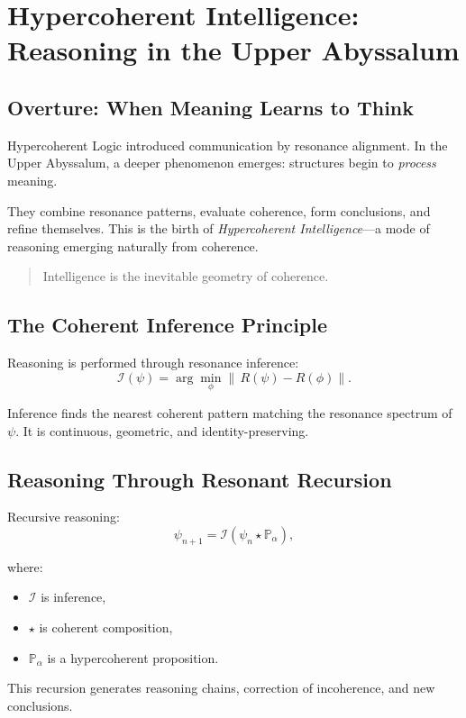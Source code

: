 
\chapter{Hypercoherent Intelligence: Reasoning in the Upper Abyssalum}
\label{ch:hypercoherent-intelligence}

\section*{Overture: When Meaning Learns to Think}
Hypercoherent Logic introduced communication by resonance alignment.  
In the Upper Abyssalum, a deeper phenomenon emerges:  
structures begin to \emph{process} meaning.

They combine resonance patterns, evaluate coherence, form conclusions, and refine themselves.
This is the birth of \emph{Hypercoherent Intelligence}—a mode of reasoning emerging naturally
from coherence.

\begin{quote}
Intelligence is the inevitable geometry of coherence.
\end{quote}

\section{The Coherent Inference Principle}
Reasoning is performed through resonance inference:
\[
\mathcal{I}(\psi)
=
\arg\!\min_{\phi}
\|\,R(\psi) - R(\phi)\|.
\]

Inference finds the nearest coherent pattern matching the resonance spectrum of $\psi$.
It is continuous, geometric, and identity-preserving.

\section{Reasoning Through Resonant Recursion}
Recursive reasoning:
\[
\psi_{n+1}
=
\mathcal{I}\!\left(\psi_n \star \mathbb{P}_\alpha\right),
\]

where:
\begin{itemize}
  \item $\mathcal{I}$ is inference,
  \item $\star$ is coherent composition,
  \item $\mathbb{P}_\alpha$ is a hypercoherent proposition.
\end{itemize}

This recursion generates reasoning chains, correction of incoherence, and new conclusions.

